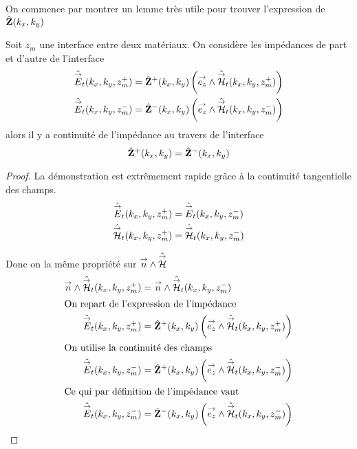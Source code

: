         On commence par montrer un lemme très utile pour trouver l'expression de \(\hat {\mathbf{Z}}(k_x,k_y)\)
        \begin{lemme}
            \label{lem:plan:continuite_impedance}
            Soit \(z_m\) une interface entre deux matériaux. On considère les impédances de part et d'autre de l'interface
            \begin{align*}
                \hat{{\overset{\rightarrow}{E}}}_t(k_x,k_y,z_m^+) &= \hat{\mathbf{Z}}^+(k_x,k_y) \left({\overset{\rightarrow}{e_z}} \wedge \hat{{\overset{\rightarrow}{\mathcal{H}}}}_t(k_x,k_y,z_m^+)\right)
                \\
                \hat{{\overset{\rightarrow}{E}}}_t(k_x,k_y,z_m^-) &= \hat{\mathbf{Z}}^-(k_x,k_y) \left({\overset{\rightarrow}{e_z}} \wedge \hat{{\overset{\rightarrow}{\mathcal{H}}}}_t(k_x,k_y,z_m^-)\right)
            \end{align*}
            alors il y a continuité de l'impédance au travers de l'interface
            \begin{equation*}
            \hat {\mathbf{Z}}^+(k_x,k_y) = \hat {\mathbf{Z}}^-(k_x,k_y)
            \end{equation*}
        \end{lemme}
        \begin{proof}
            La démonstration est extrêmement rapide grâce à la continuité tangentielle des champs.
            \begin{align*}
                \hat{{\overset{\rightarrow}{E}}}_t(k_x,k_y,z_m^+) &= \hat{{\overset{\rightarrow}{E}}}_t(k_x,k_y,z_m^-)
                \\
                \hat{{\overset{\rightarrow}{\mathcal{H}}}}_t(k_x,k_y,z_m^+) &= \hat{{\overset{\rightarrow}{\mathcal{H}}}}_t(k_x,k_y,z_m^-)
            \end{align*}

            Donc on la même propriété sur \({\overset{\rightarrow}{n}} \wedge \hat{{\overset{\rightarrow}{\mathcal{H}}}}\)
            \begin{align*}                
                {\overset{\rightarrow}{n}} \wedge \hat{{\overset{\rightarrow}{\mathcal{H}}}}_t(k_x,k_y,z_m^+) &= {\overset{\rightarrow}{n}} \wedge \hat{{\overset{\rightarrow}{\mathcal{H}}}}_t(k_x,k_y,z_m^-)
                \\
                \intertext{On repart de l'expression de l'impédance}
                \hat{{\overset{\rightarrow}{E}}}_t(k_x,k_y,z_m^+) &= \hat{\mathbf{Z}}^+(k_x,k_y) \left({\overset{\rightarrow}{e_z}} \wedge \hat{{\overset{\rightarrow}{\mathcal{H}}}}_t(k_x,k_y,z_m^+)\right)
                \\
                \intertext{On utilise la continuité des champs}
                \hat{{\overset{\rightarrow}{E}}}_t(k_x,k_y,z_m^-) &= \hat{\mathbf{Z}}^+(k_x,k_y) \left({\overset{\rightarrow}{e_z}} \wedge \hat{{\overset{\rightarrow}{\mathcal{H}}}}_t(k_x,k_y,z_m^-)\right)
                \\
                \intertext{Ce qui par définition de l'impédance vaut}
                \hat{{\overset{\rightarrow}{E}}}_t(k_x,k_y,z_m^-) &= \hat{\mathbf{Z}}^-(k_x,k_y) \left({\overset{\rightarrow}{e_z}} \wedge \hat{{\overset{\rightarrow}{\mathcal{H}}}}_t(k_x,k_y,z_m^-)\right)
            \end{align*}
        \end{proof}

